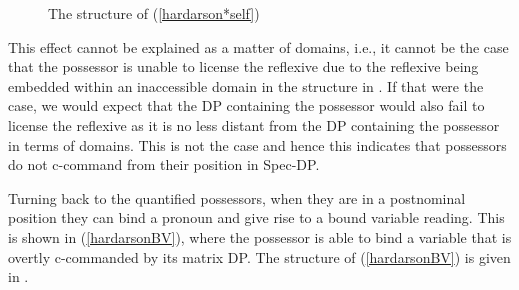 \documentclass[output=paper]{langscibook}
\begin{document}
\begin{exe}
	\ex	\label{hardarsonunbound} 
		\begin{xlist}
			\label{hardarson*self}
		\end{xlist}
\end{exe}

\begin{figure}
\caption{The structure of (\ref{hardarson*self})\label{hardarson*selfstr}}
\end{figure}

This effect cannot be explained as a matter of domains, i.e., it cannot be the case that the possessor is unable to license the reflexive due to the reflexive being embedded within an inaccessible domain in the structure in . If that were the case, we would expect that the DP containing the possessor would also fail to license the reflexive as it is no less distant from the DP containing the possessor in terms of domains. This is not the case and hence this indicates that possessors do not c-command from their position in Spec-DP.

Turning back to the quantified possessors, when they are in a postnominal position they can bind a pronoun and give rise to a bound variable reading. This is shown in (\ref{hardarsonBV}), where the possessor is able to bind a variable that is overtly c-commanded by its matrix DP. The structure of (\ref{hardarsonBV}) is given in .
\end{document}
